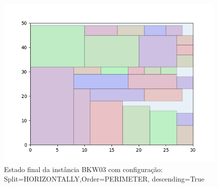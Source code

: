 \begin{figure}[H]
    \centering
    \caption[]{Estado final da instância BKW03 com configuração: Split=HORIZONTALLY,Order=PERIMETER, descending=True}
    \label{fig:bkw03-horizontally-perimeter-true}
    \includegraphics[scale=0.5]{output/figures/bkw/bkw03/horizontally/perimeter/true/00}
\end{figure}